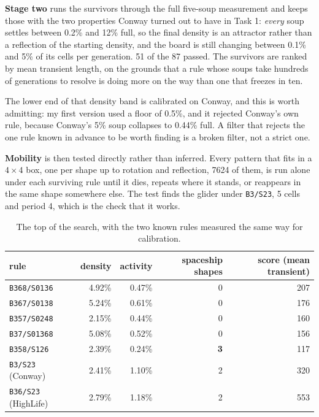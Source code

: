 \documentclass[11pt]{article}
\newcommand{\rulename}[1]{\texttt{#1}}
\begin{document}
\textbf{Stage two} runs the survivors through the full five-soup measurement and keeps those with the
two properties Conway turned out to have in Task 1: \emph{every} soup settles between 0.2\% and 12\%
full, so the final density is an attractor rather than a reflection of the starting density, and the
board is still changing between 0.1\% and 5\% of its cells per generation. 51 of the 87 passed. The
survivors are ranked by mean transient length, on the grounds that a rule whose soups take hundreds
of generations to resolve is doing more on the way than one that freezes in ten.

The lower end of that density band is calibrated on Conway, and this is worth admitting: my first
version used a floor of 0.5\%, and it rejected Conway's own rule, because Conway's 5\% soup collapses
to 0.44\% full. A filter that rejects the one rule known in advance to be worth finding is a broken
filter, not a strict one.

\textbf{Mobility} is then tested directly rather than inferred. Every pattern that fits in a
$4\times4$ box, one per shape up to rotation and reflection, 7624 of them, is run alone under each
surviving rule until it dies, repeats where it stands, or reappears in the same shape somewhere else.
The test finds the glider under \rulename{B3/S23}, 5 cells and period 4, which is the check that it
works.

\begin{table}[h]
\centering
\small
\begin{tabular}{lrrrr}
\toprule
rule & density & activity & spaceship shapes & score (mean transient) \\
\midrule
\rulename{B368/S0136} & 4.92\% & 0.47\% & 0 & 207 \\
\rulename{B367/S0138} & 5.24\% & 0.61\% & 0 & 176 \\
\rulename{B357/S0248} & 2.15\% & 0.44\% & 0 & 160 \\
\rulename{B37/S01368} & 5.08\% & 0.52\% & 0 & 156 \\
\rulename{B358/S126} & 2.39\% & 0.24\% & \textbf{3} & 117 \\
\midrule
\rulename{B3/S23} (Conway) & 2.41\% & 1.10\% & 2 & 320 \\
\rulename{B36/S23} (HighLife) & 2.79\% & 1.18\% & 2 & 553 \\
\bottomrule
\end{tabular}
\caption{The top of the search, with the two known rules measured the same way for calibration.}
\end{table}
\end{document}
